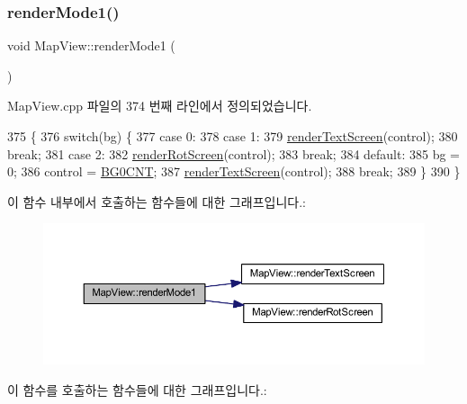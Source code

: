 \subsubsection{\texorpdfstring{render\+Mode1()}{renderMode1()}}
{\footnotesize\ttfamily void Map\+View\+::render\+Mode1 (\begin{DoxyParamCaption}{ }\end{DoxyParamCaption})}



Map\+View.\+cpp 파일의 374 번째 라인에서 정의되었습니다.


\begin{DoxyCode}
375 \{
376   \textcolor{keywordflow}{switch}(bg) \{
377   \textcolor{keywordflow}{case} 0:
378   \textcolor{keywordflow}{case} 1:
379     \mbox{\hyperlink{class_map_view_acff08c9c182f791799a27592ea7aafff}{renderTextScreen}}(control);
380     \textcolor{keywordflow}{break};
381   \textcolor{keywordflow}{case} 2:
382     \mbox{\hyperlink{class_map_view_a2e462e6466f052427cd894a7c047fa68}{renderRotScreen}}(control);
383     \textcolor{keywordflow}{break};
384   \textcolor{keywordflow}{default}:
385     bg = 0;
386     control = \mbox{\hyperlink{_globals_8cpp_a6b479219dfffa1ef8c5f2884384b579e}{BG0CNT}};
387     \mbox{\hyperlink{class_map_view_acff08c9c182f791799a27592ea7aafff}{renderTextScreen}}(control);
388     \textcolor{keywordflow}{break};
389   \}
390 \}
\end{DoxyCode}
이 함수 내부에서 호출하는 함수들에 대한 그래프입니다.\+:
\nopagebreak
\begin{figure}[H]
\begin{center}
\leavevmode
\includegraphics[width=350pt]{class_map_view_afcc44b85ee5727fc507a34672a3b6ce4_cgraph}
\end{center}
\end{figure}
이 함수를 호출하는 함수들에 대한 그래프입니다.\+:
\nopagebreak
